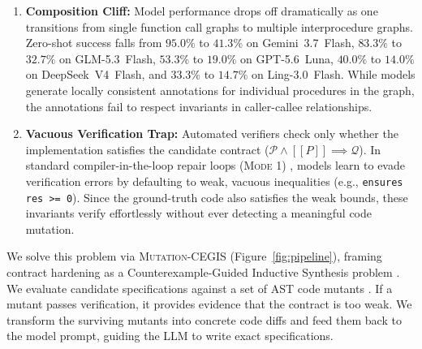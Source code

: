 \documentclass{article}
\providecommand{\llbracket}{[\![}
\providecommand{\rrbracket}{]\!]}
\begin{document}
\begin{enumerate}

\item \textbf{Composition Cliff:} Model performance drops off dramatically as one transitions from single function call graphs to multiple interprocedure graphs. Zero-shot success falls from $95.0\%$ to $41.3\%$ on Gemini~3.7~Flash, $83.3\%$ to $32.7\%$ on GLM-5.3~Flash, $53.3\%$ to $19.0\%$ on GPT-5.6~Luna, $40.0\%$ to $14.0\%$ on DeepSeek~V4~Flash, and $33.3\%$ to $14.7\%$ on Ling-3.0~Flash. While models generate locally consistent annotations for individual procedures in the graph, the annotations fail to respect invariants in caller-callee relationships.

\item \textbf{Vacuous Verification Trap:} Automated verifiers check only whether the implementation satisfies the candidate contract ($\mathcal{P} \land \llbracket P \rrbracket \implies \mathcal{Q}$). In standard compiler-in-the-loop repair loops (\textsc{Mode 1}) \citep{first2023baldur, le2022coderl}, models learn to evade verification errors by defaulting to weak, vacuous inequalities (e.g., \texttt{ensures res >= 0}). Since the ground-truth code also satisfies the weak bounds, these invariants verify effortlessly without ever detecting a meaningful code mutation.

\end{enumerate}

We solve this problem via \textsc{Mutation-CEGIS} (Figure~\ref{fig:pipeline}), framing contract hardening as a Counterexample-Guided Inductive Synthesis problem \citep{solarlezama2006cegis, alur2013sygus}. We evaluate candidate specifications against a set of AST code mutants \citep{demillo1978mutation, jia2011analysis, just2014mutants}. If a mutant passes verification, it provides evidence that the contract is too weak. We transform the surviving mutants into concrete code diffs and feed them back to the model prompt, guiding the LLM to write exact specifications.
\end{document}
